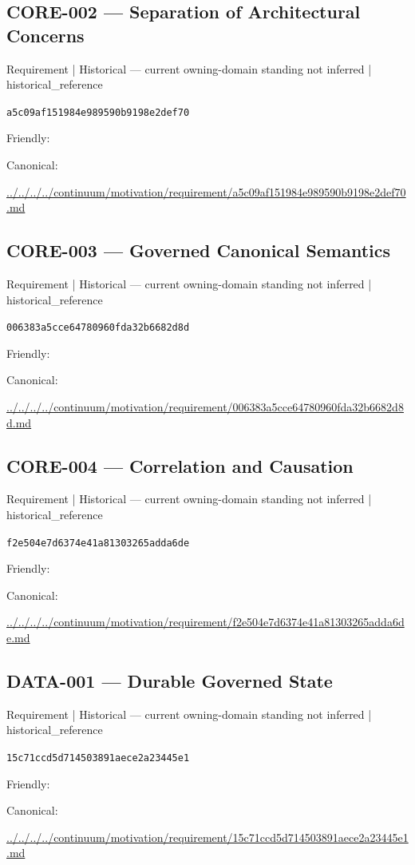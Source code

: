 \documentclass[10pt,a4paper]{article}
\begin{document}
\subsection*{CORE-002 — Separation of Architectural Concerns}
{\small Requirement | Historical — current owning-domain standing not inferred | historical\_reference}\par
\texttt{a5c09af151984e989590b9198e2def70}\par
Friendly: \par
Canonical: \par
{\footnotesize\url{../../../../continuum/motivation/requirement/a5c09af151984e989590b9198e2def70.md}}\par
\subsection*{CORE-003 — Governed Canonical Semantics}
{\small Requirement | Historical — current owning-domain standing not inferred | historical\_reference}\par
\texttt{006383a5cce64780960fda32b6682d8d}\par
Friendly: \par
Canonical: \par
{\footnotesize\url{../../../../continuum/motivation/requirement/006383a5cce64780960fda32b6682d8d.md}}\par
\subsection*{CORE-004 — Correlation and Causation}
{\small Requirement | Historical — current owning-domain standing not inferred | historical\_reference}\par
\texttt{f2e504e7d6374e41a81303265adda6de}\par
Friendly: \par
Canonical: \par
{\footnotesize\url{../../../../continuum/motivation/requirement/f2e504e7d6374e41a81303265adda6de.md}}\par
\subsection*{DATA-001 — Durable Governed State}
{\small Requirement | Historical — current owning-domain standing not inferred | historical\_reference}\par
\texttt{15c71ccd5d714503891aece2a23445e1}\par
Friendly: \par
Canonical: \par
{\footnotesize\url{../../../../continuum/motivation/requirement/15c71ccd5d714503891aece2a23445e1.md}}\par
\end{document}
